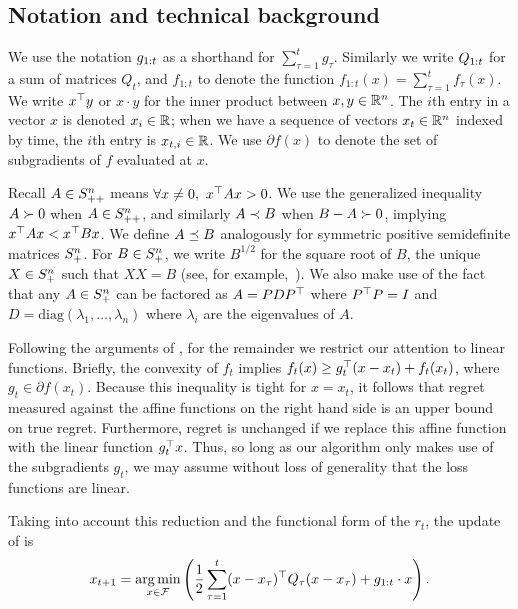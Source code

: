 \subsection{Notation and technical background}
We use the notation $g_{1:t}$ as a shorthand for $\sum_{\tau=1}^t
g_\tau$. Similarly we write $Q_{1:t}$ for a sum of matrices $Q_t$, and
$f_{1:t}$ to denote the function $f_{1:t}(x) = \sum_{\tau = 1}^t
f_\tau(x)$.  We write $x^\top y$ or $x \cdot y$ for the inner product
between $x,y \in \mathbb{R}^n$.  The $i$th entry in a vector $x$ is denoted
$x_i \in \mathbb{R}$; when we have a sequence of vectors $x_t \in \mathbb{R}^n$ indexed by time, the
$i$th entry is $x_{t,i} \in \mathbb{R}$.  We use $\partial f(x)$ to denote the set of
subgradients of $f$ evaluated at $x$.

Recall $A \in S^n_{++}$ means $\forall x\neq 0,\ x^\top Ax > 0$.  We use
the generalized inequality $A \succ 0$ when $A
\in S^n_{++}$, and similarly $A \prec B$ when $B-A \succ 0$, implying
$x^\top Ax < x^\top Bx$.  We define $A \preceq B$ analogously for
symmetric positive semidefinite matrices $S^n_{+}$.  For $B \in
S^n_{+}$, we write $B^{1/2}$ for the square root of $B$, the unique $X \in
S^n_{+}$ such that  $XX = B$ (see, for example,~).
We also make use of the fact that any $A \in S^n_{+}$ can be factored as
$A = PDP^\top $ where $P^\top P = I$ and $D=\text{diag}(\lambda_1,
\dots, \lambda_n)$ where $\lambda_i$ are the eigenvalues of $A$.  

Following the arguments of , for the remainder we
restrict our attention to linear functions.  Briefly, the convexity of
$f_t$ implies $f_t(x) \ge g_t^\top (x - x_t) + f_t(x_t)$, where $g_t \in
\partial f(x_t)$.  Because this inequality is tight for $x = x_t$, it follows
that regret measured against the affine functions on the right hand
side is an upper bound on true regret.  Furthermore, regret is
unchanged if we replace this affine function with the linear function
$g_t^\top x$.  Thus, so long as our algorithm only makes use of the
subgradients $g_t$, we may assume without loss of generality that the
loss functions are linear.


Taking into account this reduction and the functional form of the
$r_t$, the update of \FTPRL is
\begin{equation}\label{eq:linearquadopt}
x_{t+1} = \mathop{\rm arg\,min}_{x \in \mathcal{F}} \left(\frac{1}{2} 
\sum_{\tau=1}^t (x - x_\tau)^\top Q_\tau (x - x_\tau) + g_{1:t} \cdot x\right).
\end{equation}






